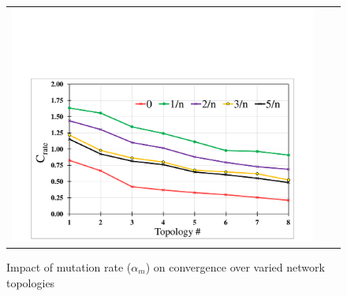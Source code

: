 \begin{center}
\begin{figure}[h]
\begin{tabular}{ccc}
{           \includegraphics [width=.6\textwidth]{results/ovrate.pdf}
        }
\end{tabular}
\caption{Impact of mutation rate ($\alpha_m$) on convergence over varied network topologies} %
   \label{fig:mut}
\end{figure}
\end{center}  

